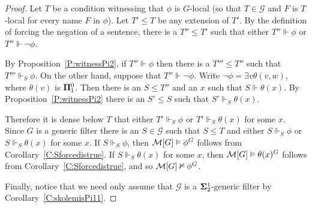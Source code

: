 \begin{proof}
Let $T$ be a condition witnessing that $\phi$ is $G$-local
(so that $T\in\mathcal{G}$ and $F$ is $T$-local for every name $F$ in $\phi$).
Let $T'\leq T$ be any extension of $T'$.
By the definition of forcing the negation of a sentence,
there is a $T''\leq T'$ such that either $T''\Vdash\phi$ or $T''\Vdash\neg\phi$.

By Proposition~\ref{P:witnessPi2}, if $T''\Vdash\phi$ then
there is a $T'''\leq T''$ such that $T'''\Vdash_S\phi$.
On the other hand, suppose that $T''\Vdash\neg\phi$.
Write $\neg\phi=\exists v \theta(v,w)$, where $\theta(v)$ is $\mathbf{\Pi}^0_1$.
Then there is an $S\leq T''$ and an $x$ such that $S\Vdash\theta(x)$.
By Proposition~\ref{P:witnessPi2} there is an $S'\leq S$ such that
$S'\Vdash_S\theta(x)$.

Therefore it is dense below $T$ that either
$T'\Vdash_S\phi$ or $T'\Vdash_S\theta(x)$ for some $x$.
Since $G$ is a generic filter there is an $S\in\mathcal{G}$ such that
$S\leq T$ and either $S\Vdash_S\phi$ or $S\Vdash_S\theta(x)$ for some $x$.
If $S\Vdash_S\phi$, then $\mathcal{M}[G]\vDash\phi^G$ follows from Corollary~\ref{C:Sforcedistrue}.
If $S\Vdash_S\theta(x)$ for some $x$,
then $\mathcal{M}[G]\vDash\theta(x)^G$ follows from Corollary~\ref{C:Sforcedistrue},
and so $\mathcal{M}[G]\nvDash\phi^G$.

Finally, notice that we need only assume that
$\mathcal{G}$ is a $\mathbf{\Sigma}^1_2$-generic filter by Corollary~\ref{C:skolemisPi11}.
\end{proof}

